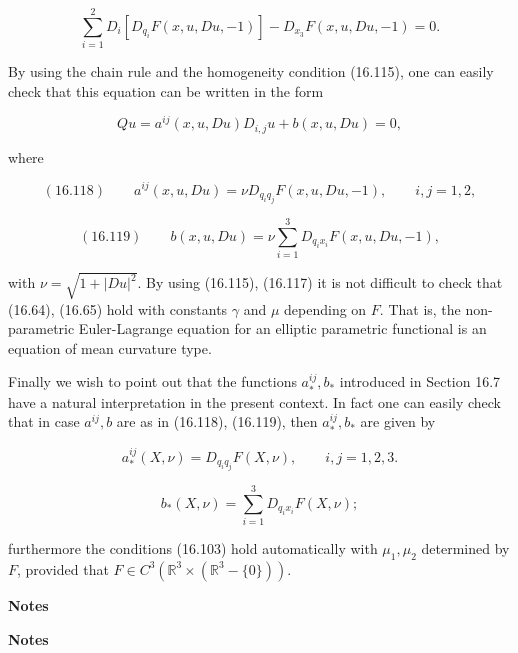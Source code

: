 \[
\sum_{i=1}^{2}D_{i}[D_{q_{i}}F(x,u,Du,-1)]-D_{x_{3}}F(x,u,Du,-1)=0.
\]

By using the chain rule and the homogeneity condition (16.115), one can easily check that this
equation can be written in the form

\[
Qu=a^{ij}(x,u,Du)D_{i,j}u+b(x,u,Du)=0,
\]

where

\[
(16.118)\qquad a^{ij}(x,u,Du)=\nu D_{q_{i}q_{j}}F(x,u,Du,-1),\qquad i,j=1,2,
\]

\[
(16.119)\qquad b(x,u,Du)=\nu\sum_{i=1}^{3}D_{q_{i}x_{i}}F(x,u,Du,-1),
\]

with $\nu=\sqrt{1+|Du|^{2}}$. By using (16.115), (16.117) it is not difficult to check that
(16.64), (16.65) hold with constants $\gamma$ and $\mu$ depending on $F$. That is, the non-
parametric Euler-Lagrange equation for an elliptic parametric functional is an equation of mean
curvature type.

Finally we wish to point out that the functions $a^{ij}_{*}, b_{*}$ introduced in Section 16.7 have a
natural interpretation in the present context. In fact one can easily check that in case $a^{ij}, b$
are as in (16.118), (16.119), then $a^{ij}_{*}, b_{*}$ are given by

\[
a^{ij}_{*}(X,\nu)=D_{q_{i}q_{j}}F(X,\nu),\qquad i,j=1,2,3.
\]

\[
b_{*}(X,\nu)=\sum_{i=1}^{3}D_{q_{i}x_{i}}F(X,\nu);
\]

furthermore the conditions (16.103) hold automatically with $\mu_{1}, \mu_{2}$ determined
by $F$, provided that $F\in C^{3}(\mathbb{R}^{3}\times (\mathbb{R}^{3}-\{0\}))$.


\begin{center}
\textbf{Notes}
\end{center}

\textbf{Notes}

\medskip

